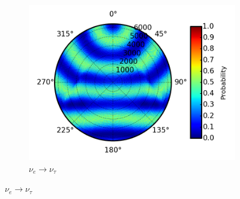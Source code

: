 \documentclass{beamer}
\begin{document}
\begin{frame}
\begin{figure}
\begin{subfigure}[b]{0.33\linewidth}
			\caption{ $\nu_{e} \rightarrow \nu_{\tau}$ }
			\includegraphics[width=\linewidth]{earth_0.1gev_nue2nutau_throughEarth.png}
		\end{subfigure}
	\end{figure}
\end{frame}
\end{document}

